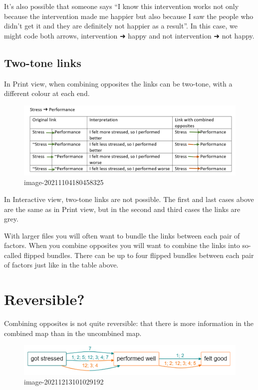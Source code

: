 \documentclass[
]{book}
\begin{document}
It's also possible that someone says ``I know this intervention works not only because the intervention made me happier but also because I saw the people who didn't get it and they are definitely not happier as a result''. In this case, we might code both arrows, intervention ➜ happy and not intervention ➜ not happy.

\hypertarget{two-tone-links-1}{%
\subsection{Two-tone links}\label{two-tone-links-1}}

In Print view, when combining opposites the links can be two-tone, with a different colour at each end.

\begin{figure}
\centering
\includegraphics[width=6.77083in,height=\textheight]{_assets/image-20211104180458325.png}
\caption{image-20211104180458325}
\end{figure}

In Interactive view, two-tone links are not possible. The first and last cases above are the same as in Print view, but in the second and third cases the links are grey.

With larger files you will often want to bundle the links between each pair of factors. When you combine opposites you will want to combine the links into so-called flipped bundles. There can be up to four flipped bundles between each pair of factors just like in the table above.

\hypertarget{reversible}{%
\section{Reversible?}\label{reversible}}

Combining opposites is not quite reversible: that there is more information in the combined map than in the uncombined map.

\begin{figure}
\centering
\includegraphics{_assets/image-20211213101029192.png}
\caption{image-20211213101029192}
\end{figure}
\end{document}
